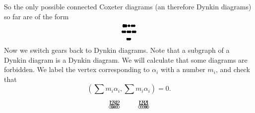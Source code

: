  So the only possible connected Coxeter diagrams (an therefore Dynkin diagrams) so far
 are of the form
 \[ \begin{xy}
   (0,0) *=<0pt>{\bullet};
   (1,-.1) *=<0pt>{\bullet} **@{-};
   p+(.5,-.05) **@{-};
   p+(.6,-.06) **{\hspace{1pt}.\hspace{1pt}};
   p+(.5,-.05) *=<0pt>{\bullet} **@{-};
   {p+(-.5,-.05) **@{-};
   p+(-.6,-.06) **{\hspace{1pt}.\hspace{1pt}};
   p+(-.5,-.05) *=<0pt>{\bullet} **@{-};
   p+(-1,-.1) *=<0pt>{\bullet} **@{-};},
   p+(.5,0) **@{-};
   p+(.6,0) **{\hspace{1pt}.\hspace{1pt}};
   p+(.5,0)  *=<0pt>{\bullet} **@{-};
   p+(1,0)  *=<0pt>{\bullet} **@{-};
 \end{xy}\]
 \[\begin{xy}
   (0,0) *=<0pt>{\bullet};
   (1,0)  *=<0pt>{\bullet} **@{-};
   p+(.5,0) **@{-};
   p+(.6,0) **{\hspace{1pt}.\hspace{1pt}};
   p+(.5,0)  *=<0pt>{\bullet} **@{-};
   p+(1,0)  *=<0pt>{\bullet} **@2{-};
   p+(.5,0) **@{-};
   p+(.6,0) **{\hspace{1pt}.\hspace{1pt}};
   p+(.5,0)  *=<0pt>{\bullet} **@{-};
   p+(1,0)  *=<0pt>{\bullet} **@{-};
 \end{xy}
 \]
\[ \begin{xy}
   (0,0)="1" *=<0pt>{\bullet};
   (1,0)="2" *=<0pt>{\bullet} **@{-},
   \ar@{-} "1";"2" <1.5pt>
   \ar@{-} "1";"2" <-1.5pt>
 \end{xy}\]
 Now we switch gears back to Dynkin diagrams. Note that a subgraph of a Dynkin diagram
 is a Dynkin diagram. We will calculate that some diagrams are forbidden. We label
 the vertex corresponding to $\alpha_i$ with a number $m_i$, and check that
 \[
    \left(\sum m_i \alpha_i, \sum m_i \alpha_i\right) = 0.
 \]
\[ \begin{xy}
   (0,0) *+!D{1} *\cir<2pt>{};
   (1,0) *+!D{2} *\cir<2pt>{} **@{-};
   p+(1,0) *+!D{3} *\cir<2pt>{} **@{-};
   p+(1,0) *+!D{4} *\cir<2pt>{} **@{=}; {?*@{>}},
   p+(1,0) *+!D{2} *\cir<2pt>{} **@{-};
 \end{xy} \qquad
 \begin{xy}
   (0,0) *+!D{1} *\cir<2pt>{};
   (1,0) *+!D{2} *\cir<2pt>{} **@{-};
   p+(1,0) *+!D{3} *\cir<2pt>{} **@{-};
   p+(1,0) *+!D{2} *\cir<2pt>{} **@{=}; {?*@{<}},
   p+(1,0) *+!D{1} *\cir<2pt>{} **@{-};
 \end{xy}\]
